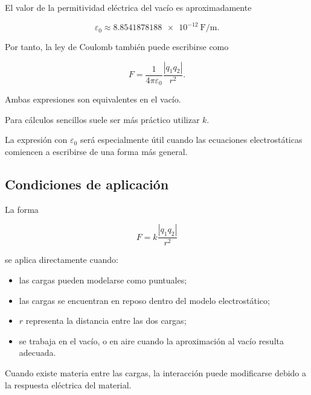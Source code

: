 El valor de la permitividad eléctrica del vacío es aproximadamente

\begin{equation}
    \boxed{
    \varepsilon_0
    \approx
    \SI{8.8541878188e-12}{\farad\per\metre}
    }.
    \label{eq:permitividad_vacio}
\end{equation}

Por tanto, la ley de Coulomb también puede escribirse como

\begin{equation}
    \boxed{
    F
    =
    \frac{1}{4\pi\varepsilon_0}
    \frac{|q_1q_2|}{r^2}
    }.
    \label{eq:coulomb_epsilon_0}
\end{equation}

Ambas expresiones son equivalentes en el vacío.

\begin{idea}

Para cálculos sencillos suele ser más práctico utilizar \(k\).

La expresión con \(\varepsilon_0\) será especialmente útil cuando las
ecuaciones electrostáticas comiencen a escribirse de una forma más general.

\end{idea}



\subsection{Condiciones de aplicación}

La forma

\[
F
=
k\frac{|q_1q_2|}{r^2}
\]

se aplica directamente cuando:

\begin{itemize}
    \item las cargas pueden modelarse como puntuales;
    \item las cargas se encuentran en reposo dentro del modelo
    electrostático;
    \item \(r\) representa la distancia entre las dos cargas;
    \item se trabaja en el vacío, o en aire cuando la aproximación al vacío
    resulta adecuada.
\end{itemize}

Cuando existe materia entre las cargas, la interacción puede modificarse
debido a la respuesta eléctrica del material.

